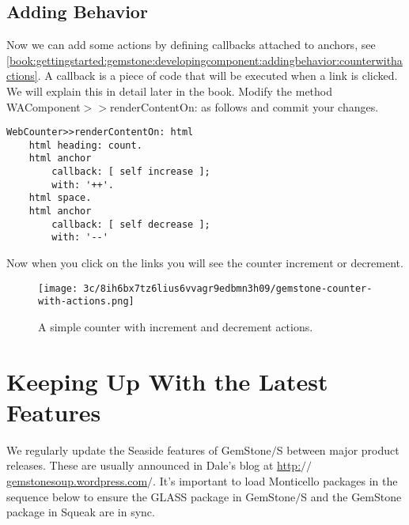\documentclass[a4paper,10pt,twoside]{book}
\newcommand{\ct}[1]{{\small\ttfamily\textup{#1}}}
\begin{document}
\subsection{Adding Behavior}
\label{book:gettingstarted:gemstone:developingcomponent:addingbehavior}

Now we can add some actions by defining callbacks attached to anchors, see \autoref{book:gettingstarted:gemstone:developingcomponent:addingbehavior:counterwithactions}. A callback is a piece of code that will be executed when a link is clicked. We will explain this in detail later in the book. 
Modify the method \ct{WAComponent$>$$>$renderContentOn:} as follows and commit your changes. 

\begin{lstlisting}
WebCounter>>renderContentOn: html
    html heading: count.
    html anchor 
        callback: [ self increase ];
        with: '++'.
    html space.
    html anchor
        callback: [ self decrease ];
        with: '--'
\end{lstlisting}

Now when you click on the links you will see the counter increment or decrement.

\begin{figure}[h!tbp]
	\begin{center}
		\texttt{[image: 3c/8ih6bx7tz6lius6vvagr9edbmn3h09/gemstone-counter-with-actions.png]}
		\caption{A simple counter with increment and decrement actions.\label{book:gettingstarted:gemstone:developingcomponent:addingbehavior:counterwithactions}}
	\end{center}
\end{figure}


\section{Keeping Up With the Latest Features}
\label{book:gettingstarted:gemstone:updating}

We regularly update the Seaside features of GemStone$/$S between major product releases. These are usually announced in Dale's blog at \href{http://gemstonesoup.wordpress.com/}{http:$/$$/$gemstonesoup.wordpress.com$/$}. It's important to load Monticello packages in the sequence below to ensure the GLASS package in GemStone$/$S and the GemStone package in Squeak are in sync.
\end{document}

